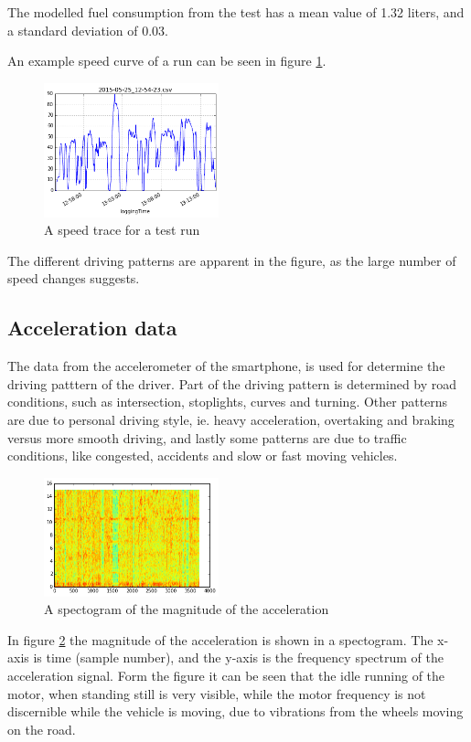 The modelled fuel consumption from the test has a mean value of 1.32 liters, and a standard deviation of 0.03.

An example speed curve of a run can be seen in figure \ref{speed}.

\begin{figure}[h]
	\centering
	\includegraphics[width=0.45\textwidth]{speed}
  \caption{A speed trace for a test run}
  \label{speed}
\end{figure}

The different driving patterns are apparent in the figure, as the large number of speed changes suggests.

\subsection{Acceleration data}

The data from the accelerometer of the smartphone, is used for determine the driving patttern of the driver. Part of the driving pattern is determined by road conditions, such as intersection, stoplights, curves and turning. Other patterns are due to personal driving style, ie. heavy acceleration, overtaking and braking versus more smooth driving, and lastly some patterns are due to traffic conditions, like congested, accidents and slow or fast moving vehicles.
\begin{figure}[h]
	\centering
	\includegraphics[width=0.45\textwidth]
{specgram}
  \caption{A spectogram of the magnitude of the acceleration}
  \label{spectogram}
\end{figure}
In figure \ref{spectogram} the magnitude of the acceleration is shown in a spectogram. The x-axis is time (sample number), and the y-axis is the frequency spectrum of the acceleration signal. Form the figure it can be seen that the idle running of the motor, when standing still is very visible, while the motor frequency is not discernible while the vehicle is moving, due to vibrations from the wheels moving on the road.


